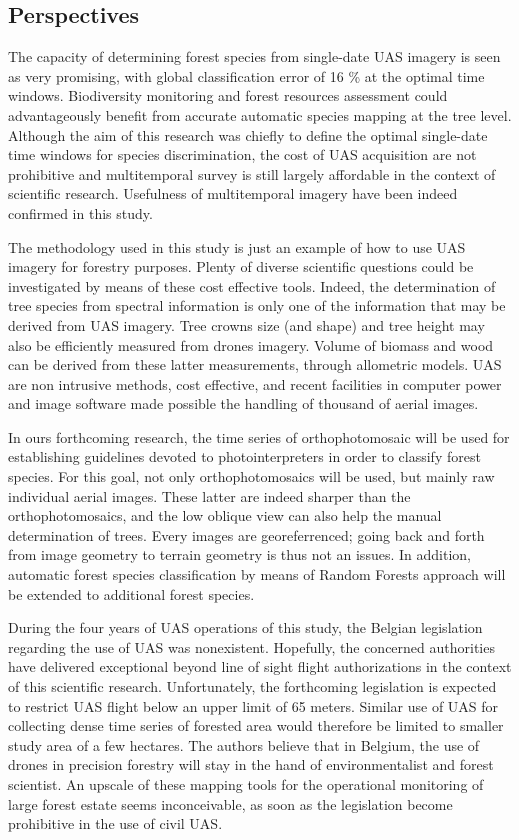\documentclass[remotesensing,article,submit,moreauthors,pdftex,12pt,a4paper]{mdpi} %
\begin{document}
\subsection{Perspectives}

The capacity of determining forest species from single-date UAS imagery is seen as very promising, with global classification error of 16 \% at the optimal time windows.
Biodiversity monitoring and forest resources assessment could advantageously benefit from accurate automatic species mapping at the tree level.
Although the aim of this research was chiefly to define the optimal single-date time windows for species discrimination, the cost of UAS acquisition are not prohibitive and multitemporal survey is still largely affordable in the context of scientific research.
Usefulness of multitemporal imagery have been indeed confirmed in this study.

The methodology used in this study is just an example of how to use UAS imagery for forestry purposes. 
Plenty of diverse scientific questions could be investigated by means of these cost effective tools.
Indeed, the determination of tree species from spectral information is only one of the information that may be derived from UAS imagery. 
Tree crowns size (and shape) and tree height may also be efficiently measured from drones imagery.
Volume of biomass and wood can be derived from these latter measurements, through allometric models.
UAS are non intrusive methods, cost effective, and recent facilities in computer power and image software made possible the handling of thousand of aerial images.

In ours forthcoming research, the time series of orthophotomosaic will be used for establishing guidelines devoted to photointerpreters in order to classify forest species.
For this goal, not only orthophotomosaics will be used, but mainly raw individual aerial images. 
These latter are indeed sharper than the orthophotomosaics, and the low oblique view can also help the manual determination of trees.
Every images are georeferrenced; going back and forth from image geometry to terrain geometry is thus not an issues.
In addition, automatic forest species classification by means of Random Forests approach will be extended to additional forest species.

During the four years of UAS operations of this study, the Belgian legislation regarding the use of UAS was nonexistent. 
Hopefully, the concerned authorities have delivered exceptional beyond line of sight flight authorizations in the context of this scientific research. 
Unfortunately, the forthcoming legislation is expected to restrict UAS flight below an upper limit of 65 meters. 
Similar use of UAS for collecting dense time series of forested area would therefore be limited to smaller study area of a few hectares. 
The authors believe that in Belgium, the use of drones in precision forestry will stay in the hand of environmentalist and forest scientist. 
An upscale of these mapping tools for the operational monitoring of large forest estate seems inconceivable, as soon as the legislation become prohibitive in the use of civil UAS. 
\end{document}
